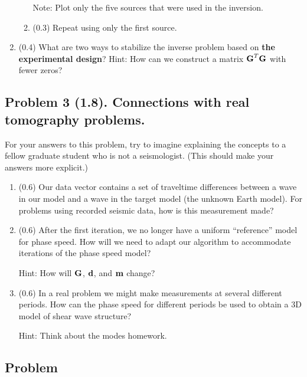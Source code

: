 \documentclass[11pt,titlepage,fleqn]{article}
\begin{document}
\begin{enumerate}
\begin{enumerate}
Note: Plot only the five sources that were used in the inversion.

\item (0.3) Repeat using only the first source.
\end{enumerate}

\item (0.4) What are two ways to stabilize the inverse problem based on {\bf the experimental design}? Hint: How can we construct a matrix $\mbox{${\bf G}$}^T\mbox{${\bf G}$}$ with fewer zeros?

\end{enumerate}


\pagebreak
\subsection*{Problem 3 (1.8). Connections with real tomography problems.}

For your answers to this problem, try to imagine explaining the concepts to a fellow graduate student who is not a seismologist. (This should make your answers more explicit.)

\begin{enumerate}
\item (0.6) Our data vector contains a set of traveltime differences between a wave in our model and a wave in the target model (\ie the unknown Earth model). For problems using recorded seismic data, how is this measurement made?

\item (0.6) After the first iteration, we no longer have a uniform ``reference'' model for phase speed. How will we need to adapt our algorithm to accommodate iterations of the phase speed model?

Hint: How will $\mbox{${\bf G}$}$, $\mbox{${\bf d}$}$, and $\mbox{${\bf m}$}$ change?

\item (0.6) In a real problem we might make measurements at several different periods. How can the phase speed for different periods be used to obtain a 3D model of shear wave structure?

Hint: Think about the modes homework.

\end{enumerate}


\subsection*{Problem} \howmuchtime\
\end{document}
